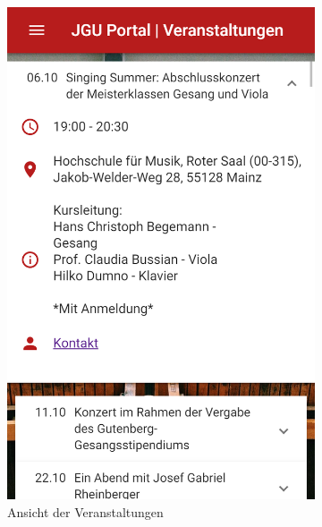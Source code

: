 \begin{figure}
\begin{subfigure}{.5\textwidth}
  \centering
  \includegraphics[width=.8\linewidth]{gfx/Events}
  \caption{Ansicht der Veranstaltungen}
  \label{fig:events}
\end{subfigure}%
\begin{subfigure}{.5\textwidth}
  \centering

\end{subfigure}
\end{figure}
